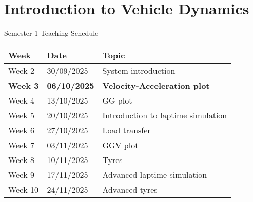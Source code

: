 \section*{Introduction to Vehicle Dynamics}

\begin{frame}{Semester 1 Teaching Schedule}
    \begin{table}
        \renewcommand{\arraystretch}{1.5}
        \begin{tabular}{l l l}
            \textbf{Week} & \textbf{Date} & \textbf{Topic} \\
            \hline
            Week 2 & 30/09/2025 & System introduction \\
            \textbf{Week 3} & \textbf{06/10/2025} & \textbf{Velocity-Acceleration plot} \\
            Week 4 & 13/10/2025 & GG plot \\
            Week 5 & 20/10/2025 & Introduction to laptime simulation \\
            Week 6 & 27/10/2025 & Load transfer \\
            Week 7 & 03/11/2025 & GGV plot \\
            Week 8 & 10/11/2025 & Tyres \\
            Week 9 & 17/11/2025 & Advanced laptime simulation \\
            Week 10& 24/11/2025 & Advanced tyres
        \end{tabular}
    \end{table}
\end{frame}